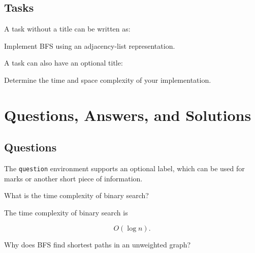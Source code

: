 \documentclass{csdept}
\begin{document}
\subsection{Tasks}

A task without a title can be written as:

\begin{task}

Implement BFS using an adjacency-list representation.

\end{task}

A task can also have an optional title:

\begin{task}

Determine the time and space complexity of your implementation.

\end{task}

\section{Questions, Answers, and Solutions}

\subsection{Questions}

The \texttt{question} environment supports an optional label,
which can be used for marks or another short piece of information.

\begin{question}[2 points]

What is the time complexity of binary search?

\end{question}

\begin{answer}

The time complexity of binary search is

\[
    O(\log n).
\]

\end{answer}

\begin{question}[3 points]

Why does BFS find shortest paths in an unweighted graph?

\end{question}
\end{document}
